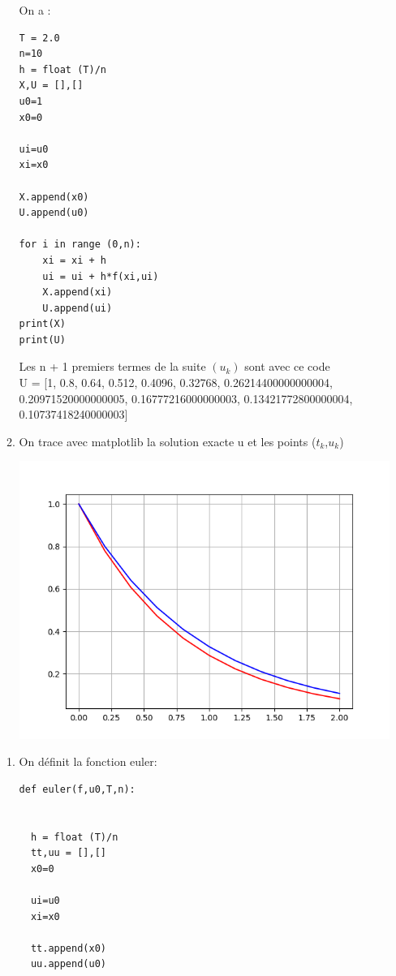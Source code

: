 \documentclass{article}
\begin{document}
\begin{enumerate}
\begin{enumerate}
On a :
\begin{lstlisting}[basicstyle=\small]
T = 2.0
n=10
h = float (T)/n
X,U = [],[]
u0=1
x0=0

ui=u0
xi=x0

X.append(x0)
U.append(u0)

for i in range (0,n):
	xi = xi + h
	ui = ui + h*f(xi,ui)
	X.append(xi)
	U.append(ui)
print(X)
print(U)
\end{lstlisting}
Les n + 1 premiers termes de la suite $(u_k)$ sont avec ce code \\
U = [1, 0.8, 0.64, 0.512, 0.4096, 0.32768, 0.26214400000000004, \\ 0.20971520000000005, 0.16777216000000003, 0.13421772800000004,  \\ 0.10737418240000003]

\item 
On trace avec matplotlib la solution exacte u et les points ($t_k$,$u_k$)
\begin{center}
\includegraphics{exo2graph.png}
\end{center}

\end{enumerate}

\begin{enumerate}
\item
On définit la fonction euler: 
\begin{lstlisting}[basicstyle=\small]
def euler(f,u0,T,n):
 

  h = float (T)/n
  tt,uu = [],[]
  x0=0

  ui=u0
  xi=x0

  tt.append(x0)
  uu.append(u0)


\end{lstlisting}
\end{enumerate}
\end{enumerate}
\end{document}
